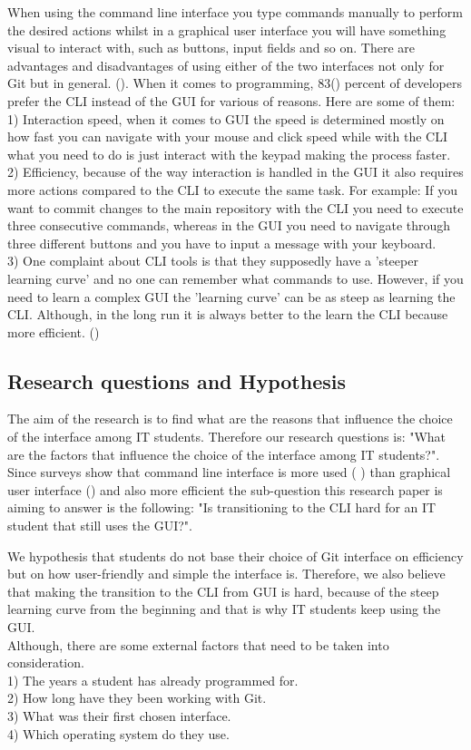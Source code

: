 \documentclass[]{report}
\begin{document}
	When using the command line interface you type commands manually to perform the desired actions whilst in a graphical user interface you will have something visual to interact with, such as buttons, input fields and so on. There are advantages and disadvantages of using either of the two interfaces not only for Git but in general. (\cite{hultstrand_git_2015}). When it comes to programming, 83(\cite{stackoverflow_stack_nodate}) percent of developers prefer the CLI instead of the GUI for various of reasons. Here are some of them: \\1) Interaction speed, when it comes to GUI the speed is determined mostly on how fast you can navigate with your mouse and click speed while with the CLI what you need to do is just interact with the keypad making the process faster. \\2) Efficiency, because of the way interaction is handled in the GUI it also requires more actions compared to the CLI to execute the same task. For example: If you want to commit changes to the main repository with the CLI you need to execute three consecutive commands, whereas in the GUI you need to navigate through three different buttons and you have to input a message with your keyboard. \\3) One complaint about CLI tools is that they supposedly have a 'steeper learning curve' and no one can remember what commands to use. However, if you need to learn a complex GUI the 'learning curve' can be as steep as learning the CLI. Although, in the long run it is always better to the learn the CLI because more efficient. (\cite{justin_c_bagley_reasons_nodate})

	\subsection{Research questions and Hypothesis}
	The aim of the research is to find what are the reasons that influence the choice of the interface among IT students. Therefore our research questions is: "What are the factors that influence the choice of the interface among IT students?". Since surveys show that command line interface is more used (\cite{stackoverflow_stack_nodate} ) than graphical user interface (\cite{justin_c_bagley_reasons_nodate}) and also more efficient the sub-question this research paper is aiming to answer is the following: "Is transitioning to the CLI hard for an IT student that still uses the GUI?".
	
	We hypothesis that students do not base their choice of Git interface on efficiency but on how user-friendly and simple the interface is. Therefore, we also believe that making the transition to the CLI from GUI is hard, because of the steep learning curve from the beginning and that is why IT students keep using the GUI.\\
	Although, there are some external factors that need to be taken into consideration. \\1) The years a student has already programmed for.\\2) How long have they been working with Git. \\3) What was their first chosen interface.\\4) Which operating system do they use. 
	
\end{document}
